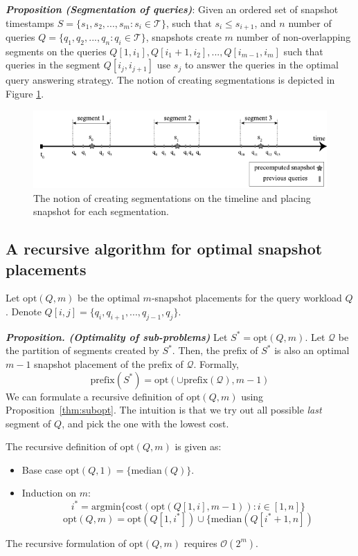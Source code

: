 \textbf{\emph{Proposition (Segmentation of queries)}}: Given an ordered set of snapshot timestamps $S=\{s_1,s_2,...,s_m:s_i \in \mathcal{T}\}$, such that $s_i \leq s_{i+1}$, and $n$ number of queries $Q = \{q_1,q_2,...,q_n: q_i \in \mathcal{T}\}$, snapshots create $m$ number of non-overlapping segments on the queries $Q[1,i_1],Q[i_1+1,i_2],...,Q[i_{m-1},i_m]$ such that queries in the segment $Q[i_j,i_{j+1}]$ use $s_j$ to answer the queries in the optimal query answering strategy. The notion of creating segmentations is depicted in Figure \ref{fig:segmentation}.

\begin{figure}
	\label{fig:segmentation}
	\centering
	\includegraphics[width=\textwidth]{figs/segmentations.pdf}
	\caption{The notion of creating segmentations on the timeline and placing snapshot for each segmentation.}
\end{figure}

\subsection{A recursive algorithm for optimal snapshot placements}

Let $\mathrm{opt}(Q, m)$ be the optimal $m$-snapshot placements for the query workload $Q$. Denote $Q[i,j] = \{q_i,q_{i+1},...,q_{j-1},q_j\}$.

\textbf{\emph{Proposition. (Optimality of sub-problems)}}
Let $S^* = \mathrm{opt}(Q, m)$.  Let $\mathcal{Q}$ be the partition of segments created by $S^*$.  Then, the prefix of $S^*$ is also an optimal $m-1$ snapshot placement of the prefix of $\mathcal{Q}$. Formally, $$\mathrm{prefix}(S^*) = \mathrm{opt}(\cup\mathrm{prefix}(\mathcal{Q}), m-1)$$
We can formulate a recursive definition of $\mathrm{opt}(Q, m)$ using
Proposition~\ref{thm:subopt}.  The intuition is that we try out all possible
{\em last} segment of $Q$, and pick the one with the lowest cost.

The recursive definition of $\mathrm{opt}(Q, m)$ is given as:

\begin{itemize}
	\item Base case $ \mathrm{opt}(Q, 1) = \{\mathrm{median}(Q)\}$.
	\item Induction on $m$:
	$$i^* = \mathrm{argmin}\{\mathrm{cost}(\mathrm{opt}(Q[1,i], m-1)): i\in[1,
	n]\}$$
	$$
	\mathrm{opt}(Q, m) = \mathrm{opt}(Q[1, i^*]) \cup \{\mathrm{median}(Q[i^*+1, n])
	$$
\end{itemize}
The recursive formulation of $\mathrm{opt}(Q, m)$ requires $\mathcal{O}(2^{m})$.

